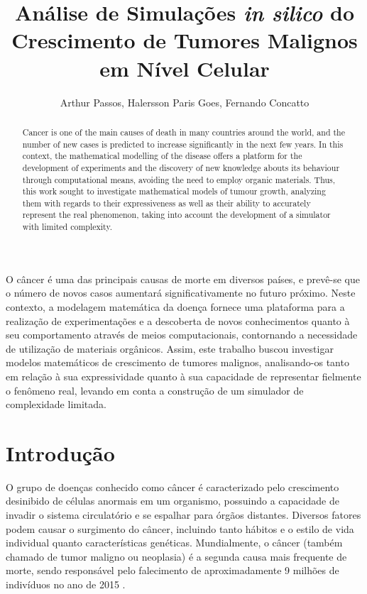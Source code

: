 \documentclass[12pt]{article}
\title{Análise de Simulações \textit{in silico} do Crescimento de Tumores Malignos em Nível Celular}
\author{Arthur Passos\inst{1}, Halersson Paris Goes\inst{1}, Fernando Concatto\inst{1}}
\begin{document}
\maketitle

\begin{abstract}
  Cancer is one of the main causes of death in many countries around the world, and the number of new cases is predicted to increase significantly in the next few years. In this context, the mathematical modelling of the disease offers a platform for the development of experiments and the discovery of new knowledge abouts its behaviour through computational means, avoiding the need to employ organic materials. Thus, this work sought to investigate mathematical models of tumour growth, analyzing them with regards to their expressiveness as well as their ability to accurately represent the real phenomenon, taking into account the development of a simulator with limited complexity.
\end{abstract}

\begin{resumo}
  O câncer é uma das principais causas de morte em diversos países, e prevê-se que o número de novos casos aumentará significativamente no futuro próximo. Neste contexto, a modelagem matemática da doença fornece uma plataforma para a realização de experimentações e a descoberta de novos conhecimentos quanto à seu comportamento através de meios computacionais, contornando a necessidade de utilização de materiais orgânicos. Assim, este trabalho buscou investigar modelos matemáticos de crescimento de tumores malignos, analisando-os tanto em relação à sua expressividade quanto à sua capacidade de representar fielmente o fenômeno real, levando em conta a construção de um simulador de complexidade limitada. %
\end{resumo}

\section{Introdução}

O grupo de doenças conhecido como câncer é caracterizado pelo crescimento desinibido de células anormais em um organismo, possuindo a capacidade de invadir o sistema circulatório e se espalhar para órgãos distantes. Diversos fatores podem causar o surgimento do câncer, incluindo tanto hábitos e o estilo de vida individual quanto características genéticas. Mundialmente, o câncer (também chamado de tumor maligno ou neoplasia) é a segunda causa mais frequente de morte, sendo responsável pelo falecimento de aproximadamente 9 milhões de indivíduos no ano de 2015 \cite{WHO2017,ACS2017}.
\end{document}

